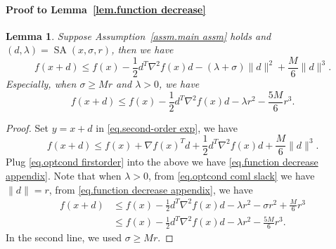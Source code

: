 \documentclass{article}
\theoremstyle{plain}
\newtheorem{lemma}[theorem]{Lemma}
\theoremstyle{definition}
\theoremstyle{remark}
\begin{document}
\paragraph{Proof to Lemma~\ref{lem.function decrease}}
\begin{lemma}
    \label{lem.function decrease appendix}
    Suppose Assumption~\ref{assm.main assm} holds and $(d,\lambda) = \operatorname{SA}(x,\sigma,r)$, then we have
    \begin{equation}
        \label{eq.function decrease appendix}
        f(x+d) \leq f(x) -\frac{1}{2}d^T \nabla^2 f(x) d -(\lambda+\sigma)\|d\|^2 +\frac{M}{6}\|d\|^3.
    \end{equation}
    Especially, when $\sigma \geq M r$ and $\lambda>0$, we have
    \begin{equation}
        \label{eq.function decrease advanced appendix}
        f(x+d) \leq f(x)-\frac{1}{2}d^T \nabla^2 f(x) d-\lambda r^2 -\frac{5M}{6} r^3.
    \end{equation}
\end{lemma}
\begin{proof}
    Set $y=x+d$ in \eqref{eq.second-order exp}, we have
    \begin{equation*}
        f(x+d) \leq f(x) +\nabla f(x)^T d +\frac{1}{2}d^T \nabla ^2 f(x) d +\frac{M}{6}\|d\|^3.
    \end{equation*}
    Plug \eqref{eq.optcond firstorder} into the above we have \eqref{eq.function decrease appendix}. Note that when $\lambda>0$, from \eqref{eq.optcond coml slack} we have $\|d\| = r$, from \eqref{eq.function decrease appendix}, we have
    \begin{equation*}
        \begin{aligned}
            f(x+d) & \leq f(x)-\frac{1}{2}d^T \nabla^2 f(x)d-\lambda r^2-\sigma r^2+\frac{M}{6}r^3 \\
                   & \leq f(x)-\frac{1}{2}d^T \nabla^2 f(x) d-\lambda r^2 -\frac{5M}{6} r^3.
        \end{aligned}
    \end{equation*}
    In the second line, we used $\sigma \geq M r.$
\end{proof}
\end{document}
